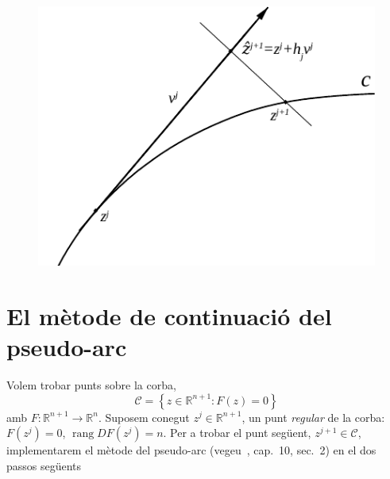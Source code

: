 \documentclass[11pt,reqno,twoside]{article}
\newcommand{\R}{\ensuremath{\mathbb{R}}}
\theoremstyle{remark}
\begin{document}
\title{}
\author{}
\date{}
\begin{figure}[!b]
  \centering
  \includegraphics[scale=1.2]{arcstep}
 \caption{\label{fig:pseudo-arc}}
\end{figure}

\section{El mètode de continuació del pseudo-arc}\label{sec:pseudoArc}
Volem trobar punts sobre la corba,
\begin{displaymath}
  \mathcal{C}=\left\{z\in\R^{n+1}: F(z) = 0\right\}
\end{displaymath}
amb $F:\R^{n+1}\longrightarrow \R^{n}$. Suposem conegut 
$z^{j}\in\R^{n+1}$, un punt \emph{regular} de la corba: 
$F(z^{j}) = 0$,  
$\mathop{\mathrm{rang}} DF(z^{j}) = n$. Per a trobar el punt següent,
$z^{j+1}\in\mathcal{C}$, implementarem el mètode del 
pseudo-arc (vegeu~\cite{Kuznetsov2004}, cap.~10, sec.~2) en el dos passos
següents
\end{document}
